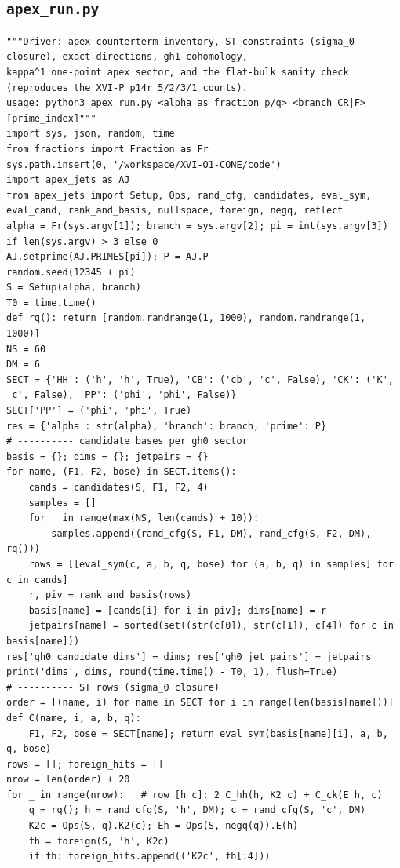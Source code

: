 \documentclass[10pt]{article}
\begin{document}
\subsection{\texttt{apex\_run.py}}
\begin{lstlisting}
"""Driver: apex counterterm inventory, ST constraints (sigma_0-closure), exact directions, gh1 cohomology,
kappa^1 one-point apex sector, and the flat-bulk sanity check (reproduces the XVI-P p14r 5/2/3/1 counts).
usage: python3 apex_run.py <alpha as fraction p/q> <branch CR|F> [prime_index]"""
import sys, json, random, time
from fractions import Fraction as Fr
sys.path.insert(0, '/workspace/XVI-O1-CONE/code')
import apex_jets as AJ
from apex_jets import Setup, Ops, rand_cfg, candidates, eval_sym, eval_cand, rank_and_basis, nullspace, foreign, negq, reflect
alpha = Fr(sys.argv[1]); branch = sys.argv[2]; pi = int(sys.argv[3]) if len(sys.argv) > 3 else 0
AJ.setprime(AJ.PRIMES[pi]); P = AJ.P
random.seed(12345 + pi)
S = Setup(alpha, branch)
T0 = time.time()
def rq(): return [random.randrange(1, 1000), random.randrange(1, 1000)]
NS = 60
DM = 6
SECT = {'HH': ('h', 'h', True), 'CB': ('cb', 'c', False), 'CK': ('K', 'c', False), 'PP': ('phi', 'phi', False)}
SECT['PP'] = ('phi', 'phi', True)
res = {'alpha': str(alpha), 'branch': branch, 'prime': P}
# ---------- candidate bases per gh0 sector
basis = {}; dims = {}; jetpairs = {}
for name, (F1, F2, bose) in SECT.items():
    cands = candidates(S, F1, F2, 4)
    samples = []
    for _ in range(max(NS, len(cands) + 10)):
        samples.append((rand_cfg(S, F1, DM), rand_cfg(S, F2, DM), rq()))
    rows = [[eval_sym(c, a, b, q, bose) for (a, b, q) in samples] for c in cands]
    r, piv = rank_and_basis(rows)
    basis[name] = [cands[i] for i in piv]; dims[name] = r
    jetpairs[name] = sorted(set((str(c[0]), str(c[1]), c[4]) for c in basis[name]))
res['gh0_candidate_dims'] = dims; res['gh0_jet_pairs'] = jetpairs
print('dims', dims, round(time.time() - T0, 1), flush=True)
# ---------- ST rows (sigma_0 closure)
order = [(name, i) for name in SECT for i in range(len(basis[name]))]
def C(name, i, a, b, q):
    F1, F2, bose = SECT[name]; return eval_sym(basis[name][i], a, b, q, bose)
rows = []; foreign_hits = []
nrow = len(order) + 20
for _ in range(nrow):   # row [h c]: 2 C_hh(h, K2 c) + C_ck(E h, c)
    q = rq(); h = rand_cfg(S, 'h', DM); c = rand_cfg(S, 'c', DM)
    K2c = Ops(S, q).K2(c); Eh = Ops(S, negq(q)).E(h)
    fh = foreign(S, 'h', K2c)
    if fh: foreign_hits.append(('K2c', fh[:4]))

\end{lstlisting}
\end{document}

